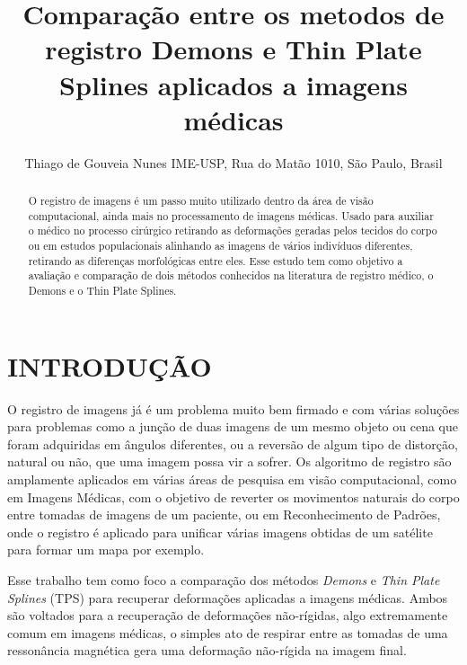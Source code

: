 \documentclass[]{spie}  %
\title{Comparação entre os metodos de registro Demons e Thin Plate Splines aplicados a imagens médicas}
\author{Thiago de Gouveia Nunes\supit{1}
\skiplinehalf
\supit{1}IME-USP, Rua do Matão 1010, São Paulo, Brasil \\
}
\begin{document}
 
\maketitle 

\begin{abstract}
O registro de imagens é um passo muito utilizado dentro da área de visão computacional, ainda mais no processamento de imagens médicas.
Usado para auxiliar o médico no processo cirúrgico retirando as deformações geradas pelos tecidos do corpo ou em estudos populacionais
alinhando as imagens de vários indivíduos diferentes, retirando as diferenças morfológicas entre eles. Esse estudo tem como objetivo
a avaliação e comparação de dois métodos conhecidos na literatura de registro médico, o Demons e o Thin Plate Splines.
\end{abstract}



\section{INTRODUÇÃO}
\label{sec:intro}  %

O registro de imagens já é um problema muito bem firmado e com várias soluções para problemas\cite{brown1992survey} como a junção de duas
imagens de um mesmo objeto ou cena que foram adquiridas em ângulos diferentes, ou a reversão de algum tipo de 
distorção, natural ou não, que uma imagem possa vir a sofrer. Os algoritmo de registro são amplamente aplicados
em várias áreas de pesquisa em visão computacional, como em Imagens Médicas, com o objetivo de reverter os
movimentos naturais do corpo entre tomadas de imagens de um paciente, ou em Reconhecimento de Padrões, onde o
registro é aplicado para unificar várias imagens obtidas de um satélite para formar um mapa por exemplo.

Esse trabalho tem como foco a comparação dos métodos \textit{Demons}\cite{thirion1995fast} e \textit{Thin Plate Splines}\cite{goshtasby1988registration} (TPS) para recuperar
deformações aplicadas a imagens médicas. Ambos são voltados para a recuperação de deformações não-rígidas, algo 
extremamente comum em imagens médicas, o simples ato de respirar entre as tomadas de uma ressonância magnética gera
uma deformação não-rígida na imagem final. 
\end{document}
